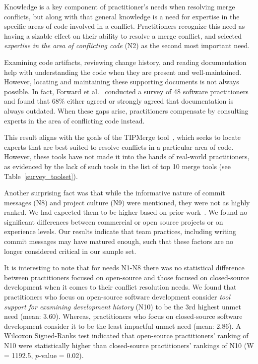Knowledge is a key component of practitioner's needs when resolving merge conflicts, but along with that general knowledge is a need for expertise in the specific areas of code involved in a conflict.
Practitioners recognize this need as having a sizable effect on their ability to resolve a merge conflict, and selected \textit{expertise in the area of conflicting code} (N2) as the second most important need.

Examining code artifacts, reviewing change history, and reading documentation help with understanding the code when they are present and well-maintained.
However, locating and maintaining these supporting documents is not always possible.
In fact, Forward et al.~\cite{forward2002documentation} conducted a survey of 48 software practitioners and found that 68\% either agreed or strongly agreed that documentation is always outdated.
When these gaps arise, practitioners compensate by consulting experts in the area of conflicting code instead.

This result aligns with the goals of the TIPMerge tool~\cite{CostaSarma}, which seeks to locate experts that are best suited to resolve conflicts in a particular area of code.
However, these tools have not made it into the hands of real-world practitioners, as evidenced by the lack of such tools in the list of top 10 merge tools (see Table~\ref{survey_toolset}).

Another surprising fact was that while the informative nature of commit messages (N8) and project culture (N9) were mentioned, they were not as highly ranked. %
We had expected them to be higher based on prior work~\cite{yamauchi2014clustering, hindle2009automatic, cortes2014automatically, hattori2008nature}. We found no significant differences between commercial or open source projects or on experience levels.
Our results indicate that team practices, including writing commit messages may have matured enough, such that these factors are no longer considered critical in our sample set. 


\label{oss_vs_closed_tool_support} 
It is interesting to note that for needs N1-N8 there was no statistical difference between practitioners focused on open-source and those focused on closed-source development when it comes to their conflict resolution needs.
We found that practitioners who focus on open-source software development consider \textit{tool support for examining development history} (N10) to be the 3rd highest unmet need (mean: 3.60).
Whereas, practitioners who focus on closed-source software development consider it to be the least impactful unmet need (mean: 2.86).
A Wilcoxon Signed-Ranks test indicated that open-source practitioners' ranking of N10 were statistically higher than closed-source practitioners' rankings of N10 (W = 1192.5, $p$-value = 0.02).


